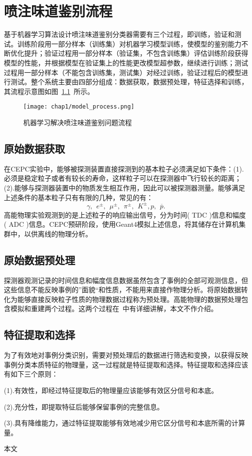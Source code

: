 \chapter{喷注味道鉴别流程}
基于机器学习算法设计喷注味道鉴别分类器需要有三个过程，即训练，验证和测试。训练阶段用一部分样本（训练集）对机器学习模型训练，使模型的鉴别能力不断优化提升；验证过程用一部分样本（验证集，不包含训练集）评估训练阶段获得模型的性能，并根据模型在验证集上的性能更改模型超参数，继续进行训练；测试过程用一部分样本（不能包含训练集，测试集）对经过训练，验证过程后的模型进行测试。整个系统主要由四部分组成：数据获取，数据预处理，特征选择和训练，其流程示意图如图~\ref{fig:model_process}~所示。
\begin{figure}[!htb]
  \centering
  \texttt{[image: chap1/model\_process.png]}
  \caption{机器学习解决喷注味道鉴别问题流程}
  \label{fig:model_process}
\end{figure}
\section{原始数据获取}
在CEPC实验中，能够被探测装置直接探测到的基本粒子必须满足如下条件：(1).必须是稳定粒子或者有较长的寿命，这样粒子可以在探测器中飞行较长的距离；(2).能够与探测器装置中的物质发生相互作用，因此可以被探测器测量。能够满足上述条件的基本粒子只有有限的几种，常见的有：
$$\gamma,~~ e^{\pm},~~ \mu^{\pm},~~ \pi^{\pm},~~ K^{\pm}, p,~~ \overline{p}.$$
高能物理实验观测到的是上述粒子的响应输出信号，分为时间( TDC )信息和幅度( ADC )信息。CEPC预研阶段，使用Geant4模拟上述信息，将其储存在计算机集群中，以供离线的物理分析。
\section{原始数据预处理}
探测器观测记录的时间信息和幅度信息数据虽然包含了事例的全部可观测信息，但这些信息不能反映事例的”面貌“和性质，不能用来直接作物理分析。将原始数据转化为能够直接反映粒子性质的物理数据过程称为预处理。高能物理的数据预处理包含模拟和重建两个过程。这两个过程在~\cite{zhengzhipeng}中有详细讲解，本文不作介绍。
\section{特征提取和选择}
为了有效地对事例分类识别，需要对预处理后的数据进行筛选和变换，以获得反映事例分类本质特征的物理量，这一过程就是特征提取和选择。特征提取和选择应该有如下三个原则：

(1).有效性，即经过特征提取后的物理量应该能够有效区分信号和本底。

(2).充分性，即提取特征后能够保留事例的完整信息。

(3).具有降维能力，通过特征提取能够有效地减少用它区分信号和本底所需的计算量。

本文